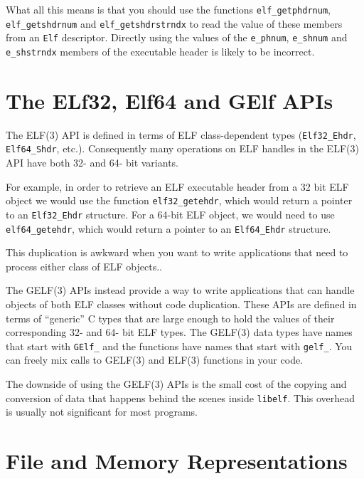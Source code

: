 \documentclass[a4paper,pdftex]{book}
\newcommand{\function}[1]{\texttt{#1}}
\newcommand{\library}[1]{\texttt{#1}}
\newcommand{\parameter}[1]{\texttt{#1}}
\newcommand{\type}[1]{\texttt{#1}}
\begin{document}
 What all this means is that you
should use the functions \function{elf\_getphdrnum},
\function{elf\_getshdrnum} and \function{elf\_getshdrstrndx} to read
the value of these members from an \type{Elf} descriptor. Directly
using the values of the \parameter{e\_phnum}, \parameter{e\_shnum} and
\parameter{e\_shstrndx} members of the executable header is likely to
be incorrect.

\section{The ELf32, Elf64 and GElf APIs}

The ELF(3) API is defined in terms of ELF class-dep\-endent types
(\type{Elf32\_\-Ehdr}, \type{Elf64\_\-Shdr}, etc.). Consequently many
operations on ELF handles in the ELF(3) API have both 32- and 64- bit
variants.

For example, in order to retrieve an ELF executable header from a 32
bit ELF object we would use the function \function{elf32\_getehdr},
which would return a pointer to an \type{Elf32\_Ehdr} structure.  For
a 64-bit ELF object, we would need to use \function{elf64\_getehdr},
which would return a pointer to an \type{Elf64\_Ehdr} structure.

This duplication is awkward when you want to write applications that
need to process either class of ELF objects..

The GELF(3) APIs instead provide a way to write
applications that can handle objects of both ELF classes without code
duplication.  These APIs are defined in terms of ``generic'' C types
that are large enough to hold the values of their corresponding 32-
and 64- bit ELF types. The GELF(3) data types have names that start
with \type{GElf\_} and the functions have names that start with
\function{gelf\_}.  You can freely mix calls to GELF(3) and ELF(3)
functions in your code.

The downside of using the GELF(3) APIs is the small cost of the
copying and conversion of data that happens behind the scenes inside
\library{libelf}. This overhead is usually
not significant for most programs.

\section{File and Memory Representations}\label{sec.representations}
\end{document}
